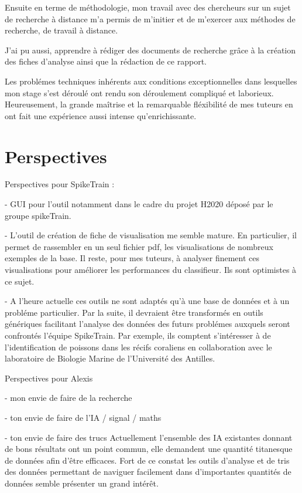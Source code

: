 Ensuite en terme de méthodologie, mon travail avec des chercheurs sur un sujet de recherche à distance m'a permis de m'initier et de m'exercer aux méthodes de recherche, de travail à distance.

J'ai pu aussi, apprendre à rédiger des documents de recherche grâce à la création des fiches d'analyse ainsi que la rédaction de ce rapport.

Les problémes techniques inhérents aux conditions exceptionnelles dans lesquelles mon stage s'est déroulé ont rendu son déroulement compliqué et laborieux.
Heureusement, la grande maîtrise et la remarquable fléxibilité de mes tuteurs en ont fait une expérience aussi intense qu'enrichissante.

\section{Perspectives}

Perspectives pour SpikeTrain :

- GUI pour l'outil notamment dans le cadre du projet H2020 déposé par le groupe spikeTrain.

- L'outil de création de fiche de visualisation me semble mature. En particulier,
il permet de rassembler en un seul fichier pdf, les visualisations de nombreux
exemples de la base. Il reste, pour mes tuteurs, à analyser finement ces visualisations pour améliorer les performances du classifieur.
Ils sont optimistes à ce sujet.

- A l'heure actuelle ces outils ne sont adaptés qu'à une base de données et à
un probléme particulier.
Par la suite, il devraient être transformés en outils génériques facilitant l'analyse des données des futurs problémes auxquels seront confrontés l'équipe SpikeTrain. Par exemple, ils comptent s'intéresser à de l'identification de
poissons dans les récifs coraliens en collaboration avec le laboratoire de
Biologie Marine de l'Université des Antilles.

Perspectives pour Alexis

- mon envie de faire de la recherche

- ton envie de faire de l'IA / signal / maths

- ton envie de faire des trucs
Actuellement l'ensemble des IA existantes donnant de bons résultats ont un point commun, elle demandent une quantité titanesque de données afin d'être efficaces.
Fort de ce constat les outils d'analyse et de tris des données permettant de naviguer facilement dans d'importantes quantités de données semble présenter un grand intérêt.
